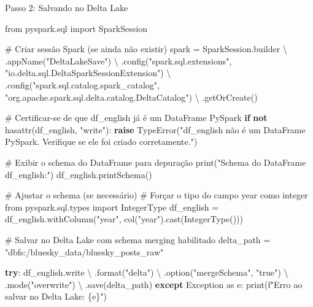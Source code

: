 \documentclass[
  letterpaper,
  DIV=11,
  numbers=noendperiod]{scrartcl}
\newenvironment{Shaded}{\begin{snugshade}}{\end{snugshade}}
\newcommand{\BuiltInTok}[1]{\textcolor[rgb]{0.00,0.23,0.31}{#1}}
\newcommand{\CommentTok}[1]{\textcolor[rgb]{0.37,0.37,0.37}{#1}}
\newcommand{\ControlFlowTok}[1]{\textcolor[rgb]{0.00,0.23,0.31}{\textbf{#1}}}
\newcommand{\ImportTok}[1]{\textcolor[rgb]{0.00,0.46,0.62}{#1}}
\newcommand{\KeywordTok}[1]{\textcolor[rgb]{0.00,0.23,0.31}{\textbf{#1}}}
\newcommand{\NormalTok}[1]{\textcolor[rgb]{0.00,0.23,0.31}{#1}}
\newcommand{\OperatorTok}[1]{\textcolor[rgb]{0.37,0.37,0.37}{#1}}
\newcommand{\PreprocessorTok}[1]{\textcolor[rgb]{0.68,0.00,0.00}{#1}}
\newcommand{\SpecialCharTok}[1]{\textcolor[rgb]{0.37,0.37,0.37}{#1}}
\newcommand{\SpecialStringTok}[1]{\textcolor[rgb]{0.13,0.47,0.30}{#1}}
\newcommand{\StringTok}[1]{\textcolor[rgb]{0.13,0.47,0.30}{#1}}
\begin{document}
Passo 2: Salvando no Delta Lake

\begin{Shaded}
\begin{Highlighting}[]
\ImportTok{from}\NormalTok{ pyspark.sql }\ImportTok{import}\NormalTok{ SparkSession}

\CommentTok{\# Criar sessão Spark (se ainda não existir)}
\NormalTok{spark }\OperatorTok{=}\NormalTok{ SparkSession.builder }\OperatorTok{\textbackslash{}}
\NormalTok{    .appName(}\StringTok{"DeltaLakeSave"}\NormalTok{) }\OperatorTok{\textbackslash{}}
\NormalTok{    .config(}\StringTok{"spark.sql.extensions"}\NormalTok{, }\StringTok{"io.delta.sql.DeltaSparkSessionExtension"}\NormalTok{) }\OperatorTok{\textbackslash{}}
\NormalTok{    .config(}\StringTok{"spark.sql.catalog.spark\_catalog"}\NormalTok{, }\StringTok{"org.apache.spark.sql.delta.catalog.DeltaCatalog"}\NormalTok{) }\OperatorTok{\textbackslash{}}
\NormalTok{    .getOrCreate()}

\CommentTok{\# Certificar{-}se de que df\_english já é um DataFrame PySpark}
\ControlFlowTok{if} \KeywordTok{not} \BuiltInTok{hasattr}\NormalTok{(df\_english, }\StringTok{"write"}\NormalTok{):}
    \ControlFlowTok{raise} \PreprocessorTok{TypeError}\NormalTok{(}\StringTok{"df\_english não é um DataFrame PySpark. Verifique se ele foi criado corretamente."}\NormalTok{)}

\CommentTok{\# Exibir o schema do DataFrame para depuração}
\BuiltInTok{print}\NormalTok{(}\StringTok{"Schema do DataFrame df\_english:"}\NormalTok{)}
\NormalTok{df\_english.printSchema()}

\CommentTok{\# Ajustar o schema (se necessário)}
\CommentTok{\# Forçar o tipo do campo \textquotesingle{}year\textquotesingle{} como integer}
\ImportTok{from}\NormalTok{ pyspark.sql.types }\ImportTok{import}\NormalTok{ IntegerType}
\NormalTok{df\_english }\OperatorTok{=}\NormalTok{ df\_english.withColumn(}\StringTok{"year"}\NormalTok{, col(}\StringTok{"year"}\NormalTok{).cast(IntegerType()))}

\CommentTok{\# Salvar no Delta Lake com schema merging habilitado}
\NormalTok{delta\_path }\OperatorTok{=} \StringTok{"dbfs:/bluesky\_data/bluesky\_posts\_raw"}

\ControlFlowTok{try}\NormalTok{:}
\NormalTok{    df\_english.write }\OperatorTok{\textbackslash{}}
\NormalTok{        .}\BuiltInTok{format}\NormalTok{(}\StringTok{"delta"}\NormalTok{) }\OperatorTok{\textbackslash{}}
\NormalTok{        .option(}\StringTok{"mergeSchema"}\NormalTok{, }\StringTok{"true"}\NormalTok{) }\OperatorTok{\textbackslash{}}
\NormalTok{        .mode(}\StringTok{"overwrite"}\NormalTok{) }\OperatorTok{\textbackslash{}}
\NormalTok{        .save(delta\_path)}
\ControlFlowTok{except} \PreprocessorTok{Exception} \ImportTok{as}\NormalTok{ e:}
    \BuiltInTok{print}\NormalTok{(}\SpecialStringTok{f"Erro ao salvar no Delta Lake: }\SpecialCharTok{\{}\NormalTok{e}\SpecialCharTok{\}}\SpecialStringTok{"}\NormalTok{)}
\end{Highlighting}
\end{Shaded}
\end{document}
